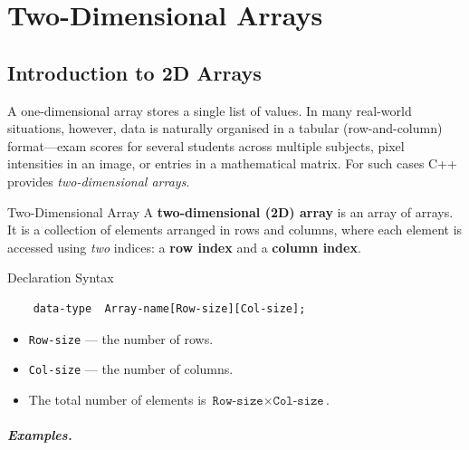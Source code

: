 \chapter{Two-Dimensional Arrays}
\label{ch:two-dimensional-arrays}

\section{Introduction to 2D Arrays}
\label{sec:intro-2d-arrays}

A one-dimensional array stores a single list of values. In many real-world
situations, however, data is naturally organised in a tabular
(row-and-column) format---exam scores for several students across multiple
subjects, pixel intensities in an image, or entries in a mathematical
matrix. For such cases C++ provides \emph{two-dimensional arrays}.

\begin{definitionbox}{Two-Dimensional Array}
A \textbf{two-dimensional (2D) array} is an array of arrays. It is a
collection of elements arranged in rows and columns, where each element is
accessed using \emph{two} indices: a \textbf{row index} and a
\textbf{column index}.
\end{definitionbox}

\begin{conceptbox}{Declaration Syntax}
\begin{verbatim}
    data-type  Array-name[Row-size][Col-size];
\end{verbatim}
\begin{itemize}
    \item \texttt{Row-size} --- the number of rows.
    \item \texttt{Col-size} --- the number of columns.
    \item The total number of elements is
          $\texttt{Row-size} \times \texttt{Col-size}$.
\end{itemize}
\end{conceptbox}

\paragraph{Examples.}

